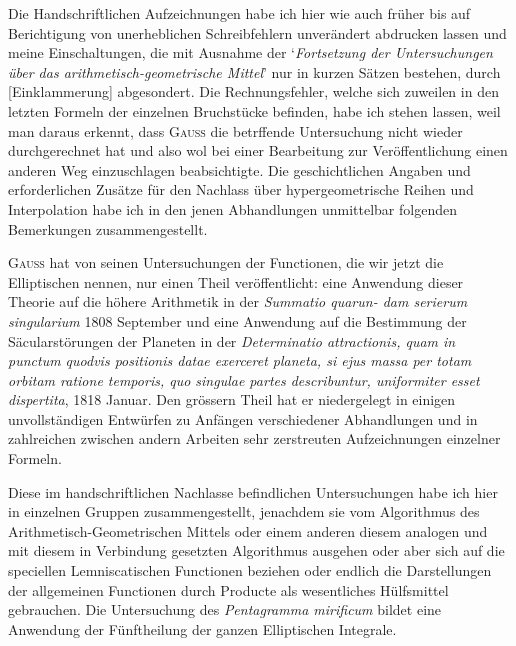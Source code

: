 \documentclass[12pt,a4paper]{article}
\begin{document}
Die Handschriftlichen Aufzeichnungen habe ich hier wie auch fr\"uher bis auf Berichtigung von unerheblichen Schreibfehlern unver\"andert abdrucken lassen und meine Einschaltungen, die mit Ausnahme der
`\textit{Fortsetzung der Untersuchungen \"uber das arithmetisch-geometrische Mittel}' nur in kurzen S\"atzen bestehen,
durch [Einklammerung] abgesondert. Die Rechnungsfehler, welche sich zuweilen in den letzten Formeln
der einzelnen Bruchst\"ucke befinden, habe ich stehen lassen, weil man daraus erkennt, dass \textsc{Gau\ss} die
betrffende Untersuchung nicht wieder durchgerechnet hat und also wol bei einer Bearbeitung zur Ver\"offentlichung einen anderen Weg einzuschlagen beabsichtigte. Die geschichtlichen Angaben und erforderlichen
Zus\"atze f\"ur den Nachlass \"uber hypergeometrische Reihen und Interpolation habe ich in den jenen Abhandlungen unmittelbar folgenden Bemerkungen zusammengestellt.

\textsc{Gau\ss} hat von seinen Untersuchungen der Functionen, die wir jetzt die Elliptischen nennen, nur
einen Theil ver\"offentlicht: eine Anwendung dieser Theorie auf die h\"ohere Arithmetik in der \textit{Summatio quarun-\linebreak
\hspace*{\fill} dam serierum singularium} 1808 September und eine Anwendung auf die Bestimmung der S\"acularst\"orungen\linebreak
\hspace*{\fill} der Planeten in der \textit{Determinatio attractionis, quam in punctum quodvis positionis datae exerceret planeta, si\linebreak
\hspace*{\fill} ejus massa per totam orbitam ratione temporis, quo singulae partes describuntur, uniformiter esset dispertita}, 1818\linebreak
\hspace*{\fill} Januar. Den gr\"ossern Theil hat er niedergelegt in einigen unvollst\"andigen Entw\"urfen zu Anf\"angen verschiedener\linebreak
\hspace*{\fill} Abhandlungen und in zahlreichen zwischen andern Arbeiten sehr zerstreuten Aufzeichnungen einzelner Formeln.

Diese im handschriftlichen Nachlasse befindlichen Untersuchungen habe ich hier in einzelnen
Gruppen zusammengestellt, jenachdem sie vom Algorithmus des Arithmetisch-Geometrischen Mittels oder
einem anderen diesem analogen und mit diesem in Verbindung gesetzten Algorithmus ausgehen oder aber
sich auf die speciellen Lemniscatischen Functionen beziehen oder endlich die Darstellungen der allgemeinen
Functionen durch Producte als wesentliches H\"ulfsmittel gebrauchen. Die Untersuchung des \textit{Pentagramma\linebreak
\hspace*{\fill} mirificum} bildet eine Anwendung der F\"unftheilung der ganzen Elliptischen Integrale.
\end{document}
